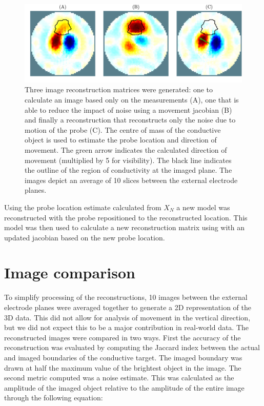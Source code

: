 \begin{figure}
    \centering
   \includegraphics[width=\textwidth]{chapter7-internal_elec_motion/imgs/recon_methods.pdf} 
   \caption[Motion correction methods]{\label{fig:motion_correction_methods} 
	Three image reconstruction matrices were generated: one to calculate an image based 
	only on the measurements (A), one that is able to reduce the impact of noise using a 
	movement jacobian (B) and finally a reconstruction that reconstructs only the noise 
	due to motion of the probe (C). The centre of mass of the conductive object is used to
	estimate the probe location and direction of movement. The green arrow indicates the 
	calculated direction of movement (multiplied by 5 for visibility).
	The black line indicates the outline of the region of conductivity at the imaged plane.
	The images depict an average of 10 slices between the external electrode planes.}
\end{figure}

Using the probe location estimate calculated from $X_N$
a new model was reconstructed with the probe repositioned 
to the reconstructed location. 
This model was then used to calculate a new reconstruction matrix 
using 
with an updated jacobian based on the new probe location. 


\section{Image comparison}
To simplify processing of the reconstructions, 10 images between the 
external electrode planes were averaged together to generate a 2D 
representation of the 3D data. This did not allow for analysis of movement in the vertical 
direction, but we did not expect this to be a major contribution in real-world data.
The reconstructed images were compared in two ways. First the accuracy of the reconstruction
was evaluated by computing the Jaccard index between the actual and imaged boundaries of the 
conductive target. The imaged boundary was drawn at half the maximum value of the brightest 
object in the image. The second metric computed was a noise estimate. This was calculated as
the amplitude of the imaged object relative to the amplitude of the entire image through the
following equation:


